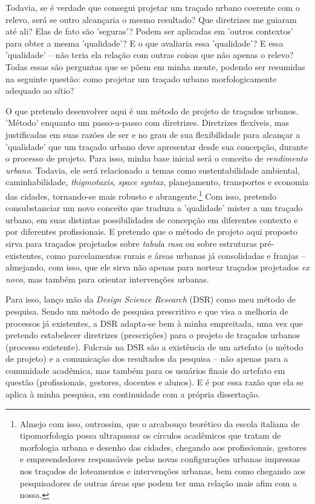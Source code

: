 \documentclass[]{report}
\begin{document}
    Todavia, se é verdade que consegui projetar um traçado urbano coerente com o relevo, será se outro alcançaria o mesmo resultado? Que diretrizes me guiaram até ali? Elas de fato são 'seguras'? Podem ser aplicadas em 'outros contextos' para obter a mesma 'qualidade'? E o que avaliaria essa 'qualidade'? E essa 'qualidade' – não teria ela relação com outras coisas que não apenas o relevo? Todas essas são perguntas que se põem em minha mente, podendo ser resumidas na seguinte questão: como projetar um traçado urbano morfologicamente adequado ao sítio?

    O que pretendo desenvolver aqui é um método de projeto de traçados urbanos. 'Método' enquanto um passo-a-passo com diretrizes. Diretrizes flexíveis, mas justificadas em suas razões de ser e no grau de sua flexibilidade para alcançar a 'qualidade' que um traçado urbano deve apresentar desde sua concepção, durante o processo de projeto. Para isso, minha base inicial será o conceito de \textit{rendimento urbano}. Todavia, ele será relacionado a temas como sustentabilidade ambiental, caminhabilidade, \textit{thigmotaxis}, \textit{space syntax}, planejamento, transportes e economia das cidades, tornando-se mais robusto e abrangente.\footnote[1]{Almejo com isso, outrossim, que o arcabouço teorético da escola italiana de tipomorfologia possa ultrapassar os círculos acadêmicos que tratam de morfologia urbana e desenho das cidades, chegando aos profissionais, gestores e empreendedores responsáveis pelas novas configurações urbanas impressas nos traçados de loteamentos e intervenções urbanas, bem como chegando aos pesquisadores de outras áreas que podem ter uma relação mais afim com a nossa.} Com isso, pretendo consubstanciar um novo conceito que traduza a 'qualidade' mister a um traçado urbano, em suas distintas possibilidades de concepção em diferentes contexto e por diferentes profissionais. E pretendo que o método de projeto aqui proposto sirva para traçados projetados sobre \textit{tabula rasa} ou sobre estruturas pré-existentes, como parcelamentos rurais e áreas urbanas já consolidadas e franjas – almejando, com isso, que ele sirva não apenas para nortear traçados projetados \textit{ex novo}, mas também para orientar intervenções urbanas. 

    Para isso, lanço mão da \textit{Design Science Research} (DSR) como meu método de pesquisa. Sendo um método de pesquisa prescritivo e que visa a melhoria de processos já existentes, a DSR adapta-se bem à minha empreitada, uma vez que pretendo estabelecer diretrizes (prescrições) para o projeto de traçados urbanos (processo existente). Fulcrais na DSR são a existência de um artefato (o método de projeto) e a comunicação dos resultados da pesquisa – não apenas para a comunidade acadêmica, mas também para os usuários finais do artefato em questão (profissionais, gestores, docentes e alunos). E é por essa razão que ela se aplica à minha pesquisa, em continuidade com a própria dissertação.
\end{document}

